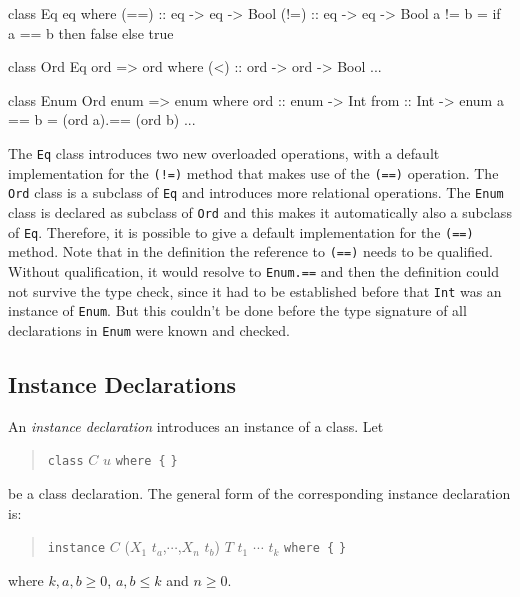 \label{classexample}
\begin{code}
class Eq eq where
    (==) :: eq -> eq -> Bool
    (!=) :: eq -> eq -> Bool
    a != b  =  if a == b then false else true

class Ord Eq ord => ord where
    (<)  :: ord -> ord -> Bool
    ...

class Enum Ord enum => enum where
    ord   :: enum -> Int
    from :: Int -> enum
    a == b  =  (ord a).== (ord b)
    ...
\end{code}

The \texttt{Eq} class introduces two new overloaded operations, with a default implementation for the \texttt{(!=)} method that makes use of the \texttt{(==)} operation. The \texttt{Ord} class is a subclass of \texttt{Eq} and introduces more relational operations. The \texttt{Enum} class is declared as subclass of \texttt{Ord} and this makes it automatically also a subclass of \texttt{Eq}. Therefore, it is possible to give a default implementation for the \texttt{(==)} method. Note that in the definition the reference to \texttt{(==)} needs to be qualified. Without qualification, it would resolve to \texttt{Enum.==} and then the definition could not survive the type check, since it had to be established before that \texttt{Int} was an instance of \texttt{Enum}. But this couldn't be done before the type signature of all declarations in \texttt{Enum} were known and checked.

\subsection{Instance Declarations} \label{instdcl}  

\begin{flushleft}
      
\end{flushleft}

An \emph{instance declaration} introduces an instance of a class. Let
\begin{quote}
\texttt{class} $C$ $u$ \texttt{where \{}  \texttt{\}}
\end{quote}
be a class declaration.
The general form of the corresponding instance declaration is:
\begin{quote}
\texttt{instance} $C$ ($X_1$ $t_a$,$\cdots$,$X_n$ $t_b$) \sym{=>} $T$ $t_1$ $\cdots$ $t_k$ \texttt{where \{}  \texttt{\}}
\end{quote}
where $k,a,b \ge 0$, $a,b \le k$ and $n \ge 0$. 

